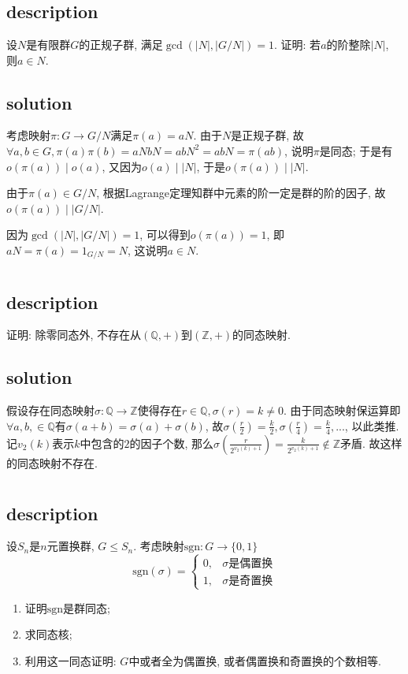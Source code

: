 \documentclass[UTF-8]{ctexart}
\begin{document}
\section{}
\subsection{description}
设$N$是有限群$G$的正规子群, 满足$\gcd(|N|, |G / N|) = 1$. 证明: 若$a$的阶整除$|N|$, 则$a \in N$.
\subsection{solution}
考虑映射$\pi: G \to G / N$满足$\pi(a) = aN$. 由于$N$是正规子群, 故$\forall a, b \in G, \pi(a)\pi(b) = aNbN = abN^2 = abN = \pi(ab)$, 说明$\pi$是同态; 于是有$o(\pi(a)) \mid o(a)$, 又因为$o(a) \mid |N|$, 于是$o(\pi(a)) \mid |N|$. 

由于$\pi(a) \in G / N$, 根据Lagrange定理知群中元素的阶一定是群的阶的因子, 故$o(\pi(a)) \mid |G / N|$.

因为$\gcd(|N|, |G / N|) = 1$, 可以得到$o(\pi(a)) = 1$, 即$aN = \pi(a) = 1_{G / N} = N$, 这说明$a \in N$.

\section{}
\subsection{description}
证明: 除零同态外, 不存在从$(\mathbb Q, +)$到$(\mathbb Z, +)$的同态映射.
\subsection{solution}

假设存在同态映射$\sigma: \mathbb Q \to \mathbb Z$使得存在$r \in \mathbb Q, \sigma(r) = k \neq 0$. 由于同态映射保运算即$\forall a, b, \in \mathbb Q$有$\sigma(a + b) = \sigma(a) + \sigma(b)$, 故$\sigma(\frac r2) = \frac{k}{2}, \sigma(\frac r4) = \frac{k}{4}, ...$, 以此类推. 记$v_2(k)$表示$k$中包含的$2$的因子个数, 那么$\sigma(\frac{r}{2^{v_2(k) + 1}}) = \frac{k}{2^{v_2(k) + 1}} \notin \mathbb Z$矛盾. 故这样的同态映射不存在.

\section{}
\subsection{description}
设$S_n$是$n$元置换群, $G \le S_n$. 考虑映射$\text{sgn}: G \to \{0, 1\}$
$$\text{sgn}(\sigma) = \begin{cases}
0, & \sigma\mbox{是偶置换}\\
1, & \sigma\mbox{是奇置换}
\end{cases}$$
\begin{enumerate}
	\item 证明$\text{sgn}$是群同态;
	\item 求同态核;
	\item 利用这一同态证明: $G$中或者全为偶置换, 或者偶置换和奇置换的个数相等.
\end{enumerate}
\end{document}
